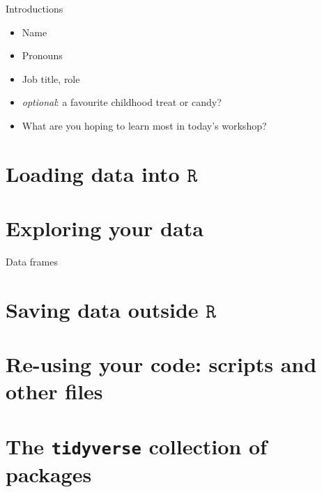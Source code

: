 \documentclass[
  11pt,
  ignorenonframetext,
]{beamer}
\providecommand{\tightlist}{%
  \setlength{\itemsep}{0pt}\setlength{\parskip}{0pt}}
\newcommand{\R}{\texttt{R}}
\begin{document}
\begin{frame}{Introductions}
\protect\hypertarget{introductions}{}
\begin{itemize}
\tightlist
\item
  Name
\item
  Pronouns
\item
  Job title, role
\item
  \emph{optional}: a favourite childhood treat or candy?
\end{itemize}

\begin{itemize}
\tightlist
\item
  What are you hoping to learn most in today's workshop?
\end{itemize}
\end{frame}

\hypertarget{loading-data-into-r}{%
\section{\texorpdfstring{Loading data into
\(\R\)}{Loading data into \textbackslash R}}\label{loading-data-into-r}}

\hypertarget{exploring-your-data}{%
\section{Exploring your data}\label{exploring-your-data}}

\begin{frame}{Data frames}
\protect\hypertarget{data-frames}{}
\end{frame}

\hypertarget{saving-data-outside-r}{%
\section{\texorpdfstring{Saving data outside
\(\R\)}{Saving data outside \textbackslash R}}\label{saving-data-outside-r}}

\hypertarget{re-using-your-code-scripts-and-other-files}{%
\section{Re-using your code: scripts and other
files}\label{re-using-your-code-scripts-and-other-files}}

\hypertarget{the-tidyverse-collection-of-packages}{%
\section{\texorpdfstring{The \texttt{tidyverse} collection of
packages}{The tidyverse collection of packages}}\label{the-tidyverse-collection-of-packages}}
\end{document}
